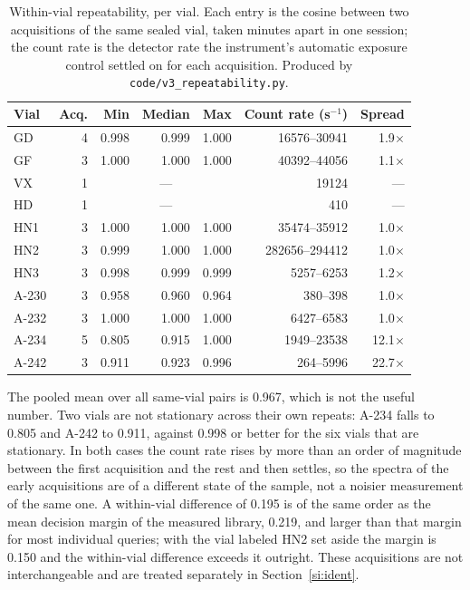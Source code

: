 \begin{table}[htbp]
\centering
\caption{Within-vial repeatability, per vial. Each entry is the cosine between two
acquisitions of the same sealed vial, taken minutes apart in one session; the count rate is
the detector rate the instrument's automatic exposure control settled on for each
acquisition. Produced by \texttt{code/v3\_repeatability.py}.}
\label{tab:si-repeat}
\small
\begin{tabular}{lrrrrrr}
\toprule
Vial & Acq. & Min & Median & Max & Count rate (s$^{-1}$) & Spread \\
\midrule
GD & 4 & 0.998 & 0.999 & 1.000 & 16576--30941 & 1.9$\times$ \\
GF & 3 & 1.000 & 1.000 & 1.000 & 40392--44056 & 1.1$\times$ \\
VX & 1 & \multicolumn{3}{c}{---} & 19124 & --- \\
HD & 1 & \multicolumn{3}{c}{---} & 410 & --- \\
HN1 & 3 & 1.000 & 1.000 & 1.000 & 35474--35912 & 1.0$\times$ \\
HN2 & 3 & 0.999 & 1.000 & 1.000 & 282656--294412 & 1.0$\times$ \\
HN3 & 3 & 0.998 & 0.999 & 0.999 & 5257--6253 & 1.2$\times$ \\
A-230 & 3 & 0.958 & 0.960 & 0.964 & 380--398 & 1.0$\times$ \\
A-232 & 3 & 1.000 & 1.000 & 1.000 & 6427--6583 & 1.0$\times$ \\
A-234 & 5 & 0.805 & 0.915 & 1.000 & 1949--23538 & 12.1$\times$ \\
A-242 & 3 & 0.911 & 0.923 & 0.996 & 264--5996 & 22.7$\times$ \\
\bottomrule
\end{tabular}

\begin{flushleft}\footnotesize The pooled mean over all same-vial pairs is 0.967, which
is not the useful number. Two vials are not stationary across their own repeats:
A-234 falls to 0.805 and A-242 to
0.911, against 0.998 or better for the six vials
that are stationary. In both cases the count rate rises by more than an order of magnitude
between the first acquisition and the rest and then settles, so the spectra of the early
acquisitions are of a different state of the sample, not a noisier measurement of the same
one. A within-vial difference of 0.195 is of the same order as the mean decision margin
of the measured library, 0.219, and larger than that margin for most individual queries;
with the vial labeled HN2 set aside the margin is 0.150 and the within-vial difference
exceeds it outright. These acquisitions are not interchangeable and are treated separately
in Section~\ref{si:ident}.\end{flushleft}
\end{table}

